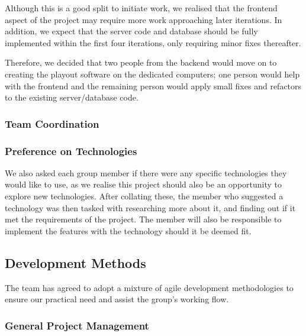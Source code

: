\documentclass[a4paper, titlepage]{article}
\begin{document}
Although this is a good split to initiate work, we realised that the frontend 
aspect of the project may require more work approaching later iterations.
In addition, we expect that the server code and database should be fully 
implemented within the first four iterations, only requiring minor fixes thereafter.

Therefore, we decided that two people from the backend would move on to creating
the playout software on the dedicated computers; one person would help with the
frontend and the remaining person would apply small fixes and refactors to the
existing server/database code.

\subsubsection{Team Coordination}


\subsubsection{Preference on Technologies}
We also asked each group member if there were any specific technologies they 
would like to use, as we realise this project should also be an opportunity to explore new
technologies. After collating these, the member who suggested a technology was then 
tasked with researching more about it, and finding out if it met the requirements of the project.
The member will also be responsible to implement the features with the technology should it be
deemed fit.



\subsection{Development Methods} \label{sec:projman_devprocess}
The team has agreed to adopt a mixture of agile development methodologies to
ensure our practical need and assist the group's working flow.

\subsubsection{General Project Management}
\end{document}
